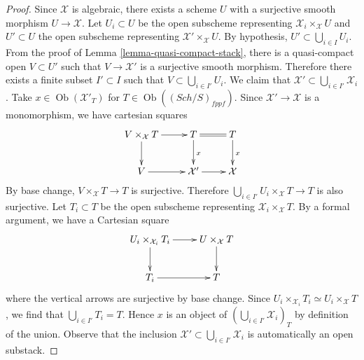 \documentclass[10pt,a4paper]{amsart}
\theoremstyle{plain}
\theoremstyle{definition}
\theoremstyle{remark}
\numberwithin{equation}{subsection}
\def\Sch{\mathit{Sch}}
\def\Ob{\mathop{\mathrm{Ob}}\nolimits}
\begin{document}
\begin{proof}
Since $\mathcal X$ is algebraic, there exists a scheme $U$ with a surjective
smooth morphism $U \to \mathcal X$. Let $U_i \subset U$ be the open subscheme
representing $\mathcal{X}_i \times_{\mathcal X} U$ and $U' \subset U$ the
open subscheme representing $\mathcal{X}' \times_{\mathcal X} U$. By
hypothesis, $U'\subset \bigcup_{i\in I} U_i$. From the proof of
Lemma \ref{lemma-quasi-compact-stack},
there is a quasi-compact open $V \subset U'$ such that $V \to \mathcal{X}'$
is a surjective smooth morphism. Therefore there exists a finite subset
$I' \subset I$ such that $V \subset \bigcup_{i \in I'}
U_i$. We claim that $\mathcal{X}' \subset \bigcup_{i \in I'} \mathcal{X}_i$.
Take $x \in \Ob(\mathcal{X}'_T)$ for
$T \in \Ob((\Sch/S)_{fppf})$.
Since $\mathcal{X}' \to \mathcal{X}$ is a monomorphism, we have cartesian
squares
$$
\xymatrix{
V \times_\mathcal{X} T \ar[r] \ar[d] &
T \ar[d]^x \ar@{=}[r] &
T \ar[d]^x \\
V \ar[r] &
\mathcal{X}' \ar[r] &
\mathcal X
}
$$
By base change, $V \times_{\mathcal X} T \to T$ is surjective. Therefore
$\bigcup_{i \in I'} U_i \times_{\mathcal X} T \to T$ is also surjective.
Let $T_i \subset T$ be the open subscheme representing
$\mathcal{X}_i \times_{\mathcal X} T$.
By a formal argument, we have a Cartesian square
$$
\xymatrix{
U_i \times_{\mathcal{X}_i} T_i \ar[r] \ar[d] &
U \times_{\mathcal X} T \ar[d] \\
T_i \ar[r] & T
}
$$
where the vertical arrows are surjective by base change. Since
$U_i \times_{\mathcal{X}_i} T_i \simeq U_i \times_{\mathcal X} T$,
we find that $\bigcup_{i \in I'} T_i = T$. Hence
$x$ is an object of $(\bigcup_{i\in I'} \mathcal{X}_i)_T$ by
definition of the union. Observe that the inclusion
$\mathcal{X}' \subset \bigcup_{i \in I'} \mathcal{X}_i$
is automatically an open substack.
\end{proof}
\end{document}
